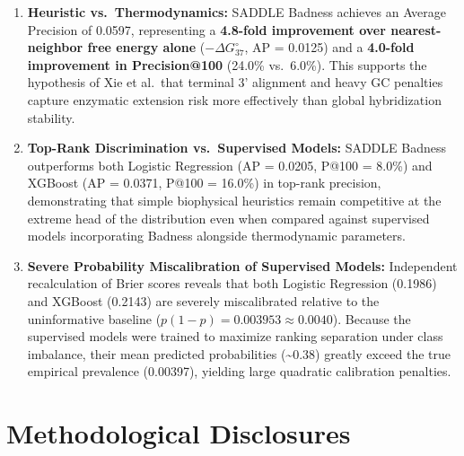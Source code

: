 \documentclass[
]{article}
\providecommand{\tightlist}{%
  \setlength{\itemsep}{0pt}\setlength{\parskip}{0pt}}
\begin{document}
\begin{enumerate}
\def\labelenumi{\arabic{enumi}.}
\tightlist
\item
  \textbf{Heuristic vs.~Thermodynamics:} SADDLE Badness achieves an
  Average Precision of 0.0597, representing a \textbf{4.8-fold
  improvement over nearest-neighbor free energy alone}
  (\(-\Delta G_{37}^\circ\), AP = 0.0125) and a \textbf{4.0-fold
  improvement in Precision@100} (24.0\% vs.~6.0\%). This supports the
  hypothesis of Xie et al.~that terminal 3' alignment and heavy GC
  penalties capture enzymatic extension risk more effectively than
  global hybridization stability.
\item
  \textbf{Top-Rank Discrimination vs.~Supervised Models:} SADDLE Badness
  outperforms both Logistic Regression (AP = 0.0205, P@100 = 8.0\%) and
  XGBoost (AP = 0.0371, P@100 = 16.0\%) in top-rank precision,
  demonstrating that simple biophysical heuristics remain competitive at
  the extreme head of the distribution even when compared against
  supervised models incorporating Badness alongside thermodynamic
  parameters.
\item
  \textbf{Severe Probability Miscalibration of Supervised Models:}
  Independent recalculation of Brier scores reveals that both Logistic
  Regression (0.1986) and XGBoost (0.2143) are severely miscalibrated
  relative to the uninformative baseline
  (\(p(1-p) = 0.003953 \approx 0.0040\)). Because the supervised models
  were trained to maximize ranking separation under class imbalance,
  their mean predicted probabilities (\textasciitilde0.38) greatly
  exceed the true empirical prevalence (0.00397), yielding large
  quadratic calibration penalties.
\end{enumerate}

\section{Methodological Disclosures}\label{methodological-disclosures}
\end{document}
